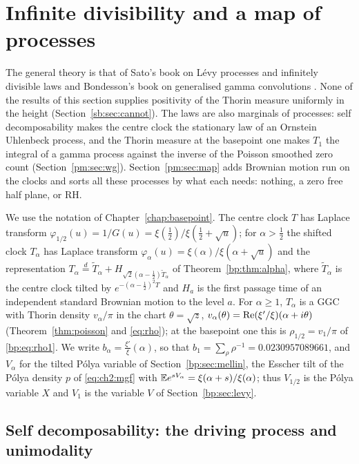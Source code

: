\section{Infinite divisibility and a map of processes}\label{ch:sato}

The general theory is that of Sato's book on L\'evy processes and infinitely divisible laws \cite{Sato99} and Bondesson's book on generalised gamma convolutions \cite{Bondesson}. None of the results of this section supplies positivity of the Thorin measure uniformly in the height (Section~\ref{sb:sec:cannot}). The laws are also marginals of processes: self decomposability makes the centre clock the stationary law of an Ornstein Uhlenbeck process, and the Thorin measure at the basepoint one makes $T_1$ the integral of a gamma process against the inverse of the Poisson smoothed zero count (Section~\ref{pm:sec:wg}). Section~\ref{pm:sec:map} adds Brownian motion run on the clocks and sorts all these processes by what each needs: nothing, a zero free half plane, or RH.

We use the notation of Chapter~\ref{chap:basepoint}. The centre clock $T$ has Laplace transform $\varphi_{1/2}(u)=1/G(u)=\xi(\frac12)/\xi(\frac12+\sqrt u)$; for $\alpha>\frac12$ the shifted clock $T_\alpha$ has Laplace transform $\varphi_\alpha(u)=\xi(\alpha)/\xi(\alpha+\sqrt u)$ and the representation $T_\alpha\stackrel d=\widetilde T_\alpha+H_{\sqrt2(\alpha-\frac12)\widetilde T_\alpha}$ of Theorem~\ref{bp:thm:alpha}, where $\widetilde T_\alpha$ is the centre clock tilted by $e^{-(\alpha-\frac12)^2T}$ and $H_a$ is the first passage time of an independent standard Brownian motion to the level $a$. For $\alpha\ge1$, $T_\alpha$ is a GGC with Thorin density $v_\alpha/\pi$ in the chart $\theta=\sqrt z$, $v_\alpha(\theta)=\operatorname{Re}(\xi'/\xi)(\alpha+i\theta)$ (Theorem~\ref{thm:poisson} and \eqref{eq:rho}); at the basepoint one this is $\rho_{1/2}=v_1/\pi$ of \eqref{bp:eq:rho1}. We write $b_\alpha=\frac{\xi'}{\xi}(\alpha)$, so that $b_1=\sum_\rho\rho^{-1}=0.0230957089661$, and $V_\alpha$ for the tilted P\'olya variable of Section~\ref{bp:sec:mellin}, the Esscher tilt of the P\'olya density $p$ of \eqref{eq:ch2:mgf} with $\mathbb{E} e^{sV_\alpha}=\xi(\alpha+s)/\xi(\alpha)$; thus $V_{1/2}$ is the P\'olya variable $X$ and $V_1$ is the variable $V$ of Section~\ref{bp:sec:levy}.

\subsection{Self decomposability: the driving process and unimodality}\label{sb:sec:sd}

